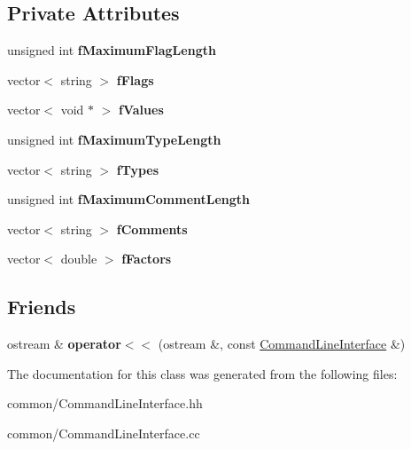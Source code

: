 \subsection*{Private Attributes}
\begin{DoxyCompactItemize}
\item 
\mbox{\label{class_command_line_interface_a60165ec5180d6de89d23d0dd5f31e82f}} 
unsigned int {\bfseries f\+Maximum\+Flag\+Length}
\item 
\mbox{\label{class_command_line_interface_a478ec92f140cb60ee661419a3e83cfbe}} 
vector$<$ string $>$ {\bfseries f\+Flags}
\item 
\mbox{\label{class_command_line_interface_acd53867f1ddfa17f31771f3ad756d1f2}} 
vector$<$ void $\ast$ $>$ {\bfseries f\+Values}
\item 
\mbox{\label{class_command_line_interface_a74f53bef62ec39d87f43bde60e2cd695}} 
unsigned int {\bfseries f\+Maximum\+Type\+Length}
\item 
\mbox{\label{class_command_line_interface_adf547c0638d96fb9aa168508e2488e1f}} 
vector$<$ string $>$ {\bfseries f\+Types}
\item 
\mbox{\label{class_command_line_interface_abe819a182b1339a6bf7cf6433a967192}} 
unsigned int {\bfseries f\+Maximum\+Comment\+Length}
\item 
\mbox{\label{class_command_line_interface_a7db731b4044f21d749aa25d37d34670c}} 
vector$<$ string $>$ {\bfseries f\+Comments}
\item 
\mbox{\label{class_command_line_interface_ad7b7b739ed2f13f4aff8ac1106cc533f}} 
vector$<$ double $>$ {\bfseries f\+Factors}
\end{DoxyCompactItemize}
\subsection*{Friends}
\begin{DoxyCompactItemize}
\item 
\mbox{\label{class_command_line_interface_abb12b31ab7922fbb11ff10d2390019fa}} 
ostream \& {\bfseries operator$<$$<$} (ostream \&, const \hyperlink{class_command_line_interface}{Command\+Line\+Interface} \&)
\end{DoxyCompactItemize}


The documentation for this class was generated from the following files\+:\begin{DoxyCompactItemize}
\item 
common/Command\+Line\+Interface.\+hh\item 
common/Command\+Line\+Interface.\+cc\end{DoxyCompactItemize}
